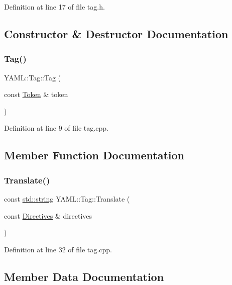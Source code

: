 Definition at line 17 of file tag.\+h.



\subsection{Constructor \& Destructor Documentation}
\mbox{\label{struct_y_a_m_l_1_1_tag_abc1ec1f5f7a987fa6c0e6a53d41bd793}} 
\subsubsection{\texorpdfstring{Tag()}{Tag()}}
{\footnotesize\ttfamily Y\+A\+M\+L\+::\+Tag\+::\+Tag (\begin{DoxyParamCaption}\item[{const \mbox{\hyperlink{struct_y_a_m_l_1_1_token}{Token}} \&}]{token }\end{DoxyParamCaption})}



Definition at line 9 of file tag.\+cpp.



\subsection{Member Function Documentation}
\mbox{\label{struct_y_a_m_l_1_1_tag_ac87f4b65dc65c3e6691111d6c7e8af3e}} 
\subsubsection{\texorpdfstring{Translate()}{Translate()}}
{\footnotesize\ttfamily const \mbox{\hyperlink{glad_8h_ac83513893df92266f79a515488701770}{std\+::string}} Y\+A\+M\+L\+::\+Tag\+::\+Translate (\begin{DoxyParamCaption}\item[{const \mbox{\hyperlink{struct_y_a_m_l_1_1_directives}{Directives}} \&}]{directives }\end{DoxyParamCaption})}



Definition at line 32 of file tag.\+cpp.



\subsection{Member Data Documentation}
\mbox{\label{struct_y_a_m_l_1_1_tag_a119563f2d43ab1d62ba3e4648a12374b}} 
